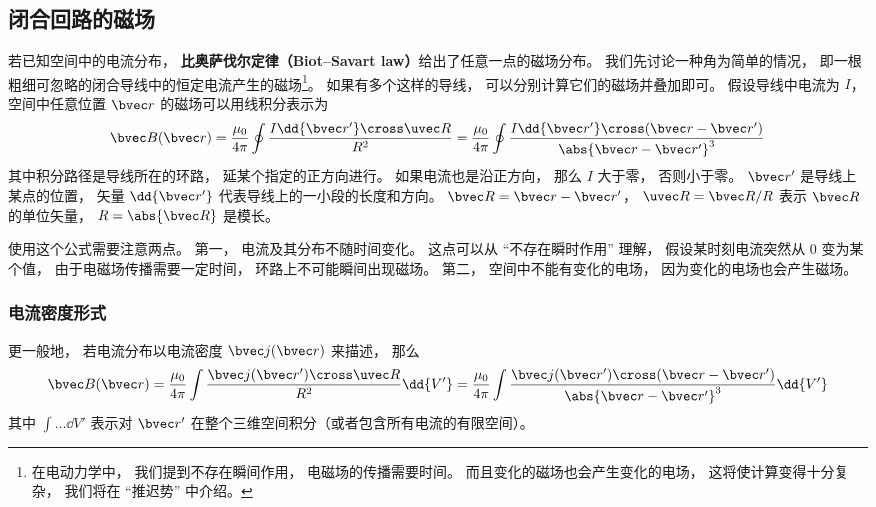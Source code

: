 
\subsection{闭合回路的磁场}
若已知空间中的电流分布， \textbf{比奥萨伐尔定律（Biot–Savart law）}给出了任意一点的磁场分布。 我们先讨论一种角为简单的情况， 即一根粗细可忽略的闭合导线中的恒定电流产生的磁场\footnote{在电动力学中， 我们提到不存在瞬间作用， 电磁场的传播需要时间。 而且变化的磁场也会产生变化的电场， 这将使计算变得十分复杂， 我们将在 “推迟势” 中介绍。}。 如果有多个这样的导线， 可以分别计算它们的磁场并叠加即可。 假设导线中电流为 $I$， 空间中任意位置 $\bvec r$ 的磁场可以用线积分表示为
\begin{equation}\label{BioSav_eq2}
\bvec B(\bvec r) = \frac{\mu_0}{4\pi} \oint \frac{I \dd{\bvec r'} \cross \uvec R}{R^2}
= \frac{\mu_0}{4\pi} \oint \frac{I \dd{\bvec r'} \cross (\bvec r - \bvec r')}{\abs{\bvec r - \bvec r'}^3}
\end{equation}
其中积分路径是导线所在的环路， 延某个指定的正方向进行。 如果电流也是沿正方向， 那么 $I$ 大于零， 否则小于零。 $\bvec r'$ 是导线上某点的位置， 矢量 $\dd{\bvec r'}$ 代表导线上的一小段的长度和方向。 $\bvec R = \bvec r - \bvec r'$， $\uvec R = \bvec R/R$ 表示 $\bvec R$ 的单位矢量， $R = \abs{\bvec R}$ 是模长。

使用这个公式需要注意两点。 第一， 电流及其分布不随时间变化。 这点可以从 “不存在瞬时作用” 理解， 假设某时刻电流突然从 0 变为某个值， 由于电磁场传播需要一定时间， 环路上不可能瞬间出现磁场。 第二， 空间中不能有变化的电场， 因为变化的电场也会产生磁场。%

\subsubsection{电流密度形式}
更一般地， 若电流分布以电流密度 $\bvec j(\bvec r)$ 来描述， 那么
\begin{equation}\label{BioSav_eq3}
\bvec B(\bvec r) = \frac{\mu_0}{4\pi} \int \frac{\bvec j(\bvec r') \cross \uvec R}{R^2} \dd{V'} = \frac{\mu_0}{4\pi} \int \frac{\bvec j(\bvec r') \cross (\bvec r - \bvec r')}{\abs{\bvec r - \bvec r'}^3} \dd{V'}
\end{equation}
其中 $\int \dots \dd{V'}$ 表示对 $\bvec r'$ 在整个三维空间积分（或者包含所有电流的有限空间）。

